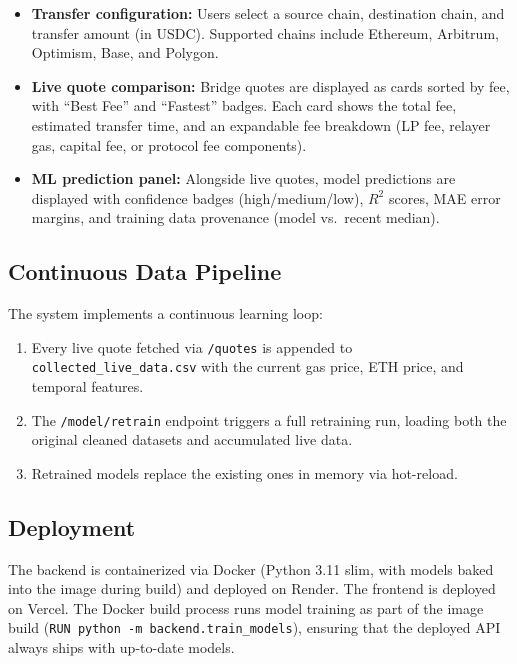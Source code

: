 \begin{itemize}
    \item \textbf{Transfer configuration:} Users select a source chain, destination chain, and transfer amount (in USDC). Supported chains include Ethereum, Arbitrum, Optimism, Base, and Polygon.
    \item \textbf{Live quote comparison:} Bridge quotes are displayed as cards sorted by fee, with ``Best Fee'' and ``Fastest'' badges. Each card shows the total fee, estimated transfer time, and an expandable fee breakdown (LP fee, relayer gas, capital fee, or protocol fee components).
    \item \textbf{ML prediction panel:} Alongside live quotes, model predictions are displayed with confidence badges (high/medium/low), $R^2$ scores, MAE error margins, and training data provenance (model vs.\ recent median).
\end{itemize}

\subsection{Continuous Data Pipeline}

The system implements a continuous learning loop:

\begin{enumerate}
    \item Every live quote fetched via \texttt{/quotes} is appended to \texttt{collected\_live\_data.csv} with the current gas price, ETH price, and temporal features.
    \item The \texttt{/model/retrain} endpoint triggers a full retraining run, loading both the original cleaned datasets and accumulated live data.
    \item Retrained models replace the existing ones in memory via hot-reload.
\end{enumerate}

\subsection{Deployment}

The backend is containerized via Docker (Python 3.11 slim, with models baked into the image during build) and deployed on Render. The frontend is deployed on Vercel. The Docker build process runs model training as part of the image build (\texttt{RUN python -m backend.train\_models}), ensuring that the deployed API always ships with up-to-date models.


